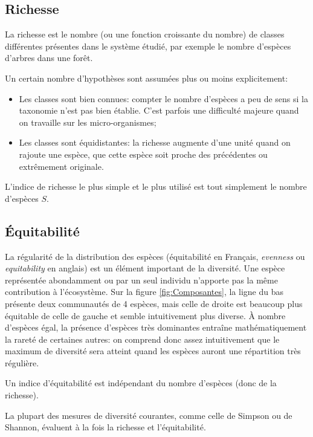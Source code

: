 \documentclass[
  11pt,
  american,
  a4paper,
  extrafontsizes,onecolumn,openright
  ]{memoir}
\providecommand{\tightlist}{%
  \setlength{\itemsep}{0pt}\setlength{\parskip}{0pt}}
\newlength{\rf}
\begin{document}
\hypertarget{richesse}{%
\subsection{Richesse}\label{richesse}}

La richesse \autocite[terme introduit par][]{Mcintosh1967} est le nombre (ou une fonction croissante du nombre) de classes différentes présentes dans le système étudié, par exemple le nombre d'espèces d'arbres dans une forêt.

Un certain nombre d'hypothèses sont assumées plus ou moins explicitement:

\begin{itemize}
\tightlist
\item
  Les classes sont bien connues: compter le nombre d'espèces a peu de sens si la taxonomie n'est pas bien établie.
  C'est parfois une difficulté majeure quand on travaille sur les micro-organismes;
\item
  Les classes sont équidistantes: la richesse augmente d'une unité quand on rajoute une espèce, que cette espèce soit proche des précédentes ou extrêmement originale.
\end{itemize}

L'indice de richesse le plus simple et le plus utilisé est tout simplement le nombre d'espèces \(S\).

\hypertarget{uxe9quitabilituxe9}{%
\subsection{Équitabilité}\label{uxe9quitabilituxe9}}

La régularité de la distribution des espèces (équitabilité en Français, \emph{evenness} ou \emph{equitability} en anglais) est un élément important de la diversité.
Une espèce représentée abondamment ou par un seul individu n'apporte pas la même contribution à l'écosystème.
Sur la figure \ref{fig:Composantes}, la ligne du bas présente deux communautés de 4 espèces, mais celle de droite est beaucoup plus équitable de celle de gauche et semble intuitivement plus diverse.
À nombre d'espèces égal, la présence d'espèces très dominantes entraîne mathématiquement la rareté de certaines autres: on comprend donc assez intuitivement que le maximum de diversité sera atteint quand les espèces auront une répartition très régulière.

Un indice d'équitabilité est indépendant du nombre d'espèces (donc de la richesse).

La plupart des mesures de diversité courantes, comme celle de Simpson ou de Shannon, évaluent à la fois la richesse et l'équitabilité.
\end{document}

